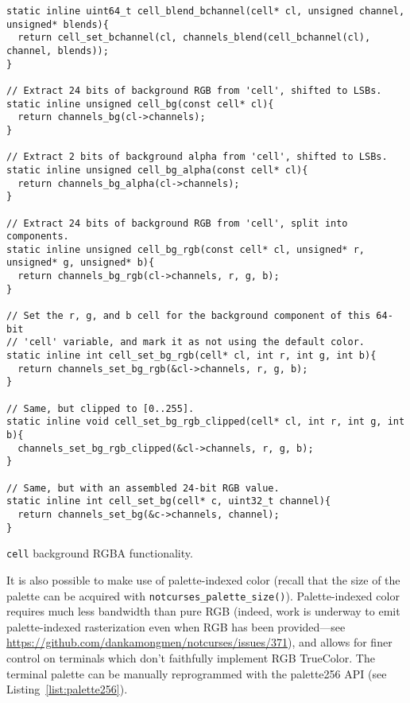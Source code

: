 \begin{listing}[!htb]
\begin{verbatim}
static inline uint64_t cell_blend_bchannel(cell* cl, unsigned channel, unsigned* blends){
  return cell_set_bchannel(cl, channels_blend(cell_bchannel(cl), channel, blends));
}

// Extract 24 bits of background RGB from 'cell', shifted to LSBs.
static inline unsigned cell_bg(const cell* cl){
  return channels_bg(cl->channels);
}

// Extract 2 bits of background alpha from 'cell', shifted to LSBs.
static inline unsigned cell_bg_alpha(const cell* cl){
  return channels_bg_alpha(cl->channels);
}

// Extract 24 bits of background RGB from 'cell', split into components.
static inline unsigned cell_bg_rgb(const cell* cl, unsigned* r, unsigned* g, unsigned* b){
  return channels_bg_rgb(cl->channels, r, g, b);
}

// Set the r, g, and b cell for the background component of this 64-bit
// 'cell' variable, and mark it as not using the default color.
static inline int cell_set_bg_rgb(cell* cl, int r, int g, int b){
  return channels_set_bg_rgb(&cl->channels, r, g, b);
}

// Same, but clipped to [0..255].
static inline void cell_set_bg_rgb_clipped(cell* cl, int r, int g, int b){
  channels_set_bg_rgb_clipped(&cl->channels, r, g, b);
}

// Same, but with an assembled 24-bit RGB value.
static inline int cell_set_bg(cell* c, uint32_t channel){
  return channels_set_bg(&c->channels, channel);
}
\end{verbatim}
\caption{\texttt{cell} background RGBA functionality.}
\label{listing:cellrgbbg}
\end{listing}

It is also possible to make use of palette-indexed color (recall that the size
of the palette can be acquired with \texttt{notcurses\_palette\_size()}).
Palette-indexed color requires much less bandwidth than pure RGB (indeed, work
is underway to emit palette-indexed rasterization even when RGB has been
provided---see \url{https://github.com/dankamongmen/notcurses/issues/371}),
and allows for finer control on terminals which don't faithfully implement RGB
TrueColor. The terminal palette can be manually reprogrammed with the
palette256 API (see Listing~\ref{list:palette256}).

